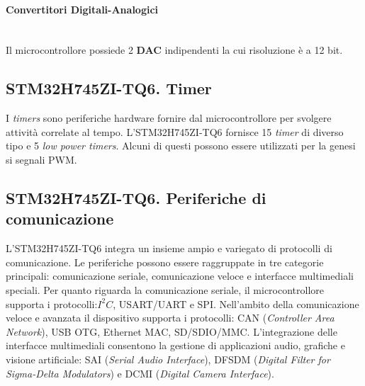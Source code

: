 \paragraph{\small{Convertitori Digitali-Analogici}}\mbox{}\\
Il microcontrollore possiede 2 \textbf{DAC} indipendenti la cui risoluzione è a 12 bit.




\subsection{STM32H745ZI-TQ6. Timer}
I \textit{timers} sono periferiche hardware fornire dal microcontrollore per svolgere attività correlate al tempo.
L'STM32H745ZI-TQ6 fornisce 15 \textit{timer} di diverso tipo e 5 \textit{low power timers}. Alcuni di questi possono essere utilizzati per la genesi si segnali PWM.\\



\subsection{STM32H745ZI-TQ6. Periferiche di comunicazione}
L'STM32H745ZI-TQ6 integra un insieme ampio e variegato di protocolli di comunicazione. Le periferiche possono essere raggruppate in tre categorie principali: comunicazione seriale, comunicazione veloce e interfacce multimediali speciali.
Per quanto riguarda la comunicazione seriale, il microcontrollore supporta i protocolli:$I^{2}C$, USART/UART e SPI.
Nell'ambito della comunicazione veloce e avanzata il dispositivo supporta i protocolli: CAN (\textit{Controller Area Network}), USB OTG, Ethernet MAC, SD/SDIO/MMC.
L'integrazione delle interfacce multimediali consentono la gestione di applicazioni audio, grafiche e visione artificiale: SAI (\textit{Serial Audio Interface}), DFSDM (\textit{Digital Filter for Sigma-Delta Modulators}) e DCMI (\textit{Digital Camera Interface}).


